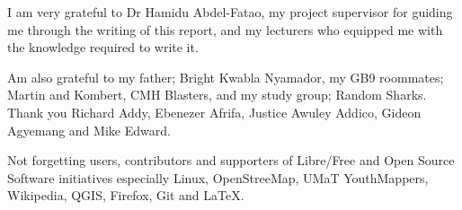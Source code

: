 

\begin{acknowledgements}      %
I am very grateful to Dr Hamidu Abdel-Fatao, my project supervisor for guiding me through the writing of this report, and my lecturers who equipped me with the knowledge required to write it.

Am also grateful to my father; Bright Kwabla Nyamador, my GB9 roommates; Martin and Kombert, CMH Blasters, and my study group; Random Sharks. Thank you Richard Addy, Ebenezer Afrifa, Justice Awuley Addico, Gideon Agyemang and Mike Edward.

Not forgetting users, contributors and supporters of Libre/Free and Open Source Software initiatives especially Linux, OpenStreeMap, UMaT YouthMappers, Wikipedia, QGIS, Firefox, Git and \LaTeX.
\end{acknowledgements}



